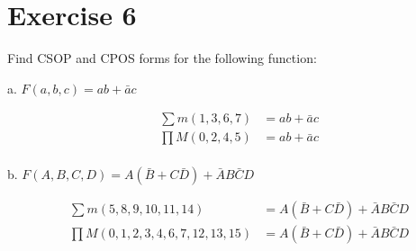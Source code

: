 \documentclass{article}
\begin{document}
    \section{Exercise 6}
    \begin{flushleft}
        Find CSOP and CPOS forms for the following function:
    \end{flushleft}
    \begin{flushleft}
        a. $F(a, b, c) = ab + \bar{a}c$
    \end{flushleft}
    \begin{align*}
        &\sum m(1, 3, 6, 7)  &= ab + \bar{a}c \\
        &\prod M(0, 2, 4, 5) &= ab + \bar{a}c \\
    \end{align*}   
    \begin{flushleft}
        b. $F(A, B, C, D) = A(\bar{B} + C\bar{D}) + \bar{A}B\bar{C}D$
    \end{flushleft}
    \begin{align*}
        &\sum m(5, 8, 9, 10, 11, 14) &= A(\bar{B} + C\bar{D}) + \bar{A}B\bar{C}D \\
        &\prod M(0, 1, 2, 3, 4, 6, 7, 12, 13, 15) &= A(\bar{B} + C\bar{D}) + \bar{A}B\bar{C}D
    \end{align*}

    \newpage
\end{document}
